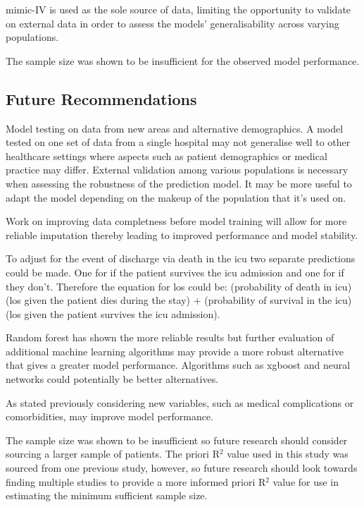 \documentclass[11pt]{article}
\begin{document}
\gls{mimic}-IV is used as the sole source of data, limiting the opportunity to validate on external data in order to assess the models' generalisability across varying populations.

The sample size was shown to be insufficient for the observed model performance.

\subsection{Future Recommendations}

Model testing on data from new areas and alternative demographics. A model tested on one set of data from a single hospital may not generalise well to other healthcare settings where aspects such as patient demographics or medical practice may differ. External validation among various populations is necessary when assessing the robustness of the prediction model.  It may be more useful to adapt the model depending on the makeup of the population that it's used on.

Work on improving data completness before model training will allow for more reliable imputation thereby leading to improved performance and model stability. 

To adjust for the event of discharge via death in the \gls{icu} two separate predictions could be made. One for if the patient survives the \gls{icu} admission and one for if they don't. Therefore the equation for \gls{los} could be: (probability of death in \gls{icu})(\gls{los} given the patient dies during the stay) + (probability of survival in the \gls{icu})(\gls{los} given the patient survives the \gls{icu} admission).

Random forest has shown the more reliable results but further evaluation of additional machine learning algorithms may provide a more robust alternative that gives a greater model performance. Algorithms such as \gls{xgboost} and neural networks could potentially be better alternatives.

As stated previously considering new variables, such as medical complications or comorbidities, may improve model performance.

The sample size was shown to be insufficient so future research should consider sourcing a larger sample of patients. The priori R\(^2\) value used in this study was sourced from one previous study, however, so future research should look towards finding multiple studies to provide a more informed priori R\(^2\) value for use in estimating the minimum sufficient sample size.
\end{document}
